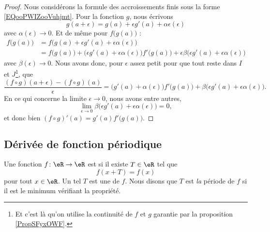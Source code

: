 \begin{proof}
    Nous considérons la formule des accroissements finis sous la forme \eqref{EQooPWIZooVuhjmt}. Pour la fonction \( g\), nous écrivons
    \begin{equation}
        g(a+\epsilon)=g(a)+\epsilon g'(a)+\alpha\epsilon(\epsilon)
    \end{equation}
    avec \( \alpha(\epsilon)\to 0\). Et de même pour \( f\big( g(a) \big)\) :
    \begin{subequations}
        \begin{align}
            f\big( g(a) \big)&=f\big( g(a)+\epsilon g'(a)+\epsilon\alpha(\epsilon) \big)\\
            &=f\big( g(a) \big)+\big( \epsilon g'(a)+\epsilon\alpha(\epsilon) \big)f'\big( g(a) \big)+\epsilon\beta\big( \epsilon g'(a)+\epsilon\alpha(\epsilon) \big)
        \end{align}
    \end{subequations}
    avec \( \beta(\epsilon)\to 0\). Nous avons donc, pour \( \epsilon\) assez petit pour que tout reste dans \( I\) et \( J\)\footnote{Et c'est là qu'on utilise la continuité de \( f\) et \( g\) garantie par la proposition \ref{PropSFyxOWF}.}, que
    \begin{equation}
            \frac{ (f\circ g)(a+\epsilon)-(f\circ g)(a) }{ \epsilon }=\big( g'(a)+\alpha(\epsilon) \big)f'\big( g(a) \big)+\beta\big( \epsilon g'(a)+\epsilon\alpha(\epsilon) \big).
    \end{equation}
    En ce qui concerne la limite \( \epsilon\to 0\), nous avons entre autres,
    \begin{equation}
        \lim_{\epsilon\to 0}\beta\big( \epsilon g'(a)+\epsilon\alpha(\epsilon) \big)=0,
    \end{equation}
    et donc bien \( (f\circ g)'(a)=g'( a )f'\big( g(a) \big)\).
\end{proof}

\subsection{Dérivée de fonction périodique}

\begin{definition}      \label{DEFooHUZAooYyBmwe}
    Une fonction \( f\colon \eR\to \eR\) est  si il existe \( T\in \eR\) tel que
    \begin{equation}
        f(x+T)=f(x)
    \end{equation}
    pour tout \( x\in \eR\). Un tel \( T\) est une  de \( f\). Nous disons que \( T\) est \emph{la} période de \( f\) si il est le minimum vérifiant la propriété.
\end{definition}

